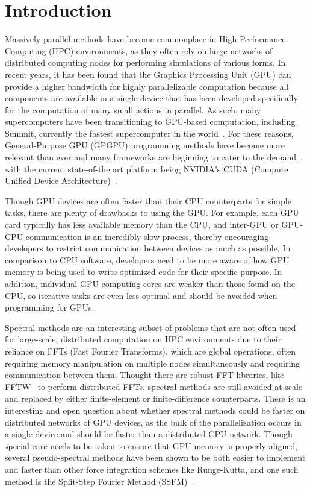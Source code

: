 \section*{Introduction}

Massively parallel methods have become commonplace in High-Performance Computing (HPC) environments, as they often rely on large networks of distributed computing nodes for performing simulations of various forms.
In recent years, it has been found that the Graphics Processing Unit (GPU) can provide a higher bandwidth for highly parallelizable computation because all components are available in a single device that has been developed specifically for the computation of many small actions in parallel.
As such, many supercomputers have been transitioning to GPU-based computation, including Summit, currently the fastest supercomputer in the world~\cite{kahle2019}.
For these reasons, General-Purpose GPU (GPGPU) programming methods have become more relevant than ever and many frameworks are beginning to cater to the demand~\cite{reyes2012, fatica2008, besard2016, opencl}, with the current state-of-the art platform being NVIDIA's CUDA (Compute Unified Device Architecture)~\cite{CUDAPG}.

Though GPU devices are often faster than their CPU counterparts for simple tasks, there are plenty of drawbacks to using the GPU.
For example, each GPU card typically has less available memory than the CPU, and inter-GPU or GPU-CPU communication is an incredibly slow process, thereby encouraging developers to restrict communication between devices as much as possible.
In comparison to CPU software, developers need to be more aware of how GPU memory is being used to write optimized code for their specific purpose.
In addition, individual GPU computing cores are weaker than those found on the CPU, so iterative tasks are even less optimal and should be avoided when programming for GPUs.

Spectral methods are an interesting subset of problems that are not often used for large-scale, distributed computation on HPC environments due to their reliance on FFTs (Fast Fourier Transforms), which are global operations, often requiring memory manipulation on multiple nodes simultaneously and requiring communication between them.
Thought there are robust FFT libraries, like FFTW~\cite{frigo1998} to perform distributed FFTs, spectral methods are still avoided at scale and replaced by either finite-element or finite-difference counterparts.
There is an interesting and open question about whether spectral methods could be faster on distributed networks of GPU devices, as the bulk of the parallelization occurs in a single device and should be faster than a distributed CPU network.
Though special care needs to be taken to ensure that GPU memory is properly aligned, several pseudo-spectral methods have been shown to be both easier to implement and faster than other force integration schemes like Runge-Kutta, and one such method is the Split-Step Fourier Method (SSFM)~\cite{brehler2017}.

